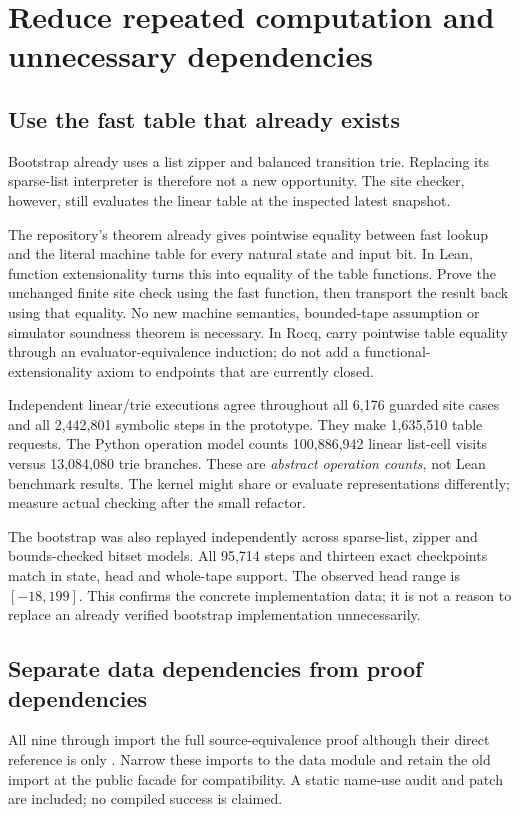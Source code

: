 \documentclass[11pt]{article}
\newcommand{\file}[1]{{\small\path{#1}}}
\begin{document}
\section{Reduce repeated computation and unnecessary dependencies}
\subsection{Use the fast table that already exists}
Bootstrap already uses a list zipper and balanced transition trie. Replacing its sparse-list interpreter is therefore not a new opportunity. The site checker, however, still evaluates the linear table at the inspected latest snapshot.

The repository's \file{fast215} theorem already gives pointwise equality between fast lookup and the literal machine table for every natural state and input bit. In Lean, function extensionality turns this into equality of the table functions. Prove the unchanged finite site check using the fast function, then transport the result back using that equality. No new machine semantics, bounded-tape assumption or simulator soundness theorem is necessary. In Rocq, carry pointwise table equality through an evaluator-equivalence induction; do not add a functional-extensionality axiom to endpoints that are currently closed.

Independent linear/trie executions agree throughout all 6,176 guarded site cases and all 2,442,801 symbolic steps in the prototype. They make 1,635,510 table requests. The Python operation model counts 100,886,942 linear list-cell visits versus 13,084,080 trie branches. These are \emph{abstract operation counts}, not Lean benchmark results. The kernel might share or evaluate representations differently; measure actual checking after the small refactor.

The bootstrap was also replayed independently across sparse-list, zipper and bounds-checked bitset models. All 95,714 steps and thirteen exact checkpoints match in state, head and whole-tape support. The observed head range is $[-18,199]$. This confirms the concrete implementation data; it is not a reason to replace an already verified bootstrap implementation unnecessarily.

\subsection{Separate data dependencies from proof dependencies}
All nine \file{KSites215Batch000} through \file{008} import the full source-equivalence proof although their direct reference is only \file{KSource215.t215}. Narrow these imports to the data module and retain the old import at the public facade for compatibility. A static name-use audit and patch are included; no compiled success is claimed.
\end{document}
